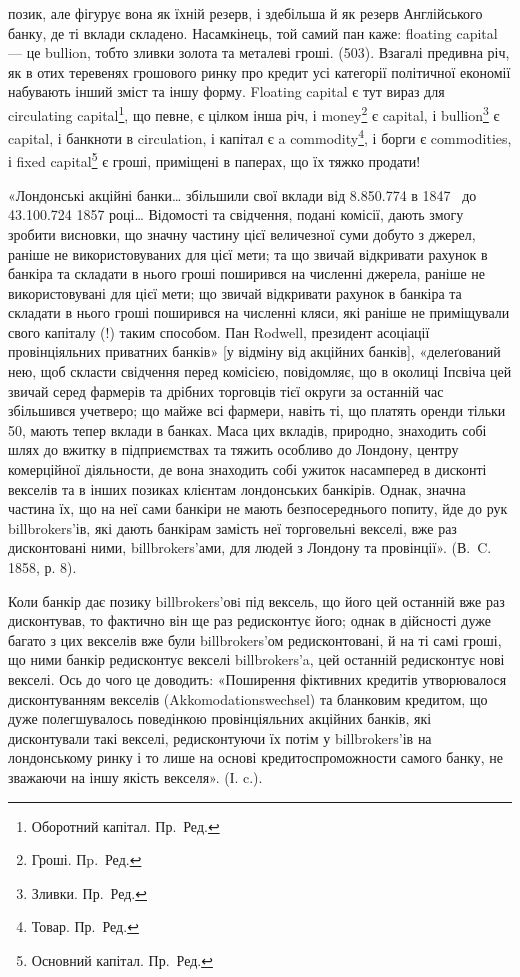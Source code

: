 \parcont{}  %
позик, але фігурує вона як їхній резерв, і здебільша й як резерв Англійського
банку, де ті вклади складено. Насамкінець, той самий пан каже: floating
capital — це bullion, тобто зливки золота та металеві гроші. (503). Взагалі предивна
річ, як в отих теревенях грошового ринку про кредит усі категорії політичної
економії набувають інший зміст та іншу форму. Floating capital є тут
вираз для circulating capital\footnote*{
Оборотний капітал. Пр.~Ред.
}, що певне, є цілком інша річ, і money\footnote*{
Гроші. Пp.~Ред.
} є capital,
і bullion\footnote*{
Зливки. Пр.~Ред.
} є capital, і банкноти в circulation, і капітал є a commodity\footnote*{
Товар. Пр.~Ред.
}, і борги є
commodities, і fixed capital\footnote*{
Основний капітал. Пр.~Ред.
} є гроші, приміщені в паперах, що їх тяжко продати!

«Лондонські акційні банки\dots{} збільшили свої вклади від \num{8.850.774}
в 1847~ до \num{43.100.724} 1857 році\dots{} Відомості та свідчення, подані
комісії, дають змогу зробити висновки, що значну частину цієї величезної суми
добуто з джерел, раніше не використовуваних для цієї мети; та що звичай відкривати
рахунок в банкіра та складати в нього гроші поширився на численні
джерела, раніше не використовувані для цієї мети; що звичай відкривати рахунок
в банкіра та складати в нього гроші поширився на численні кляси, які
раніше не приміщували свого капіталу (!) таким способом. Пан Rodwell, президент
асоціації провінціяльних приватних банків» [у відміну від акційних
банків], «делеґований нею, щоб скласти свідчення перед комісією, повідомляє,
що в околиці Іпсвіча цей звичай серед фармерів та дрібних торговців тієї
округи за останній час збільшився учетверо; що майже всі фармери, навіть ті,
що платять оренди тільки 50, мають тепер вклади в банках. Маса
цих вкладів, природно, знаходить собі шлях до вжитку в підприємствах та
тяжить особливо до Лондону, центру комерційної діяльности, де вона знаходить
собі ужиток насамперед в дисконті векселів та в інших позиках клієнтам лондонських
банкірів. Однак, значна частина їх, що на неї сами банкіри не мають
безпосереднього попиту, йде до рук billbrokers’ів, які дають банкірам замість
неї торговельні векселі, вже раз дисконтовані ними, billbrokers’ами, для людей
з Лондону та провінції». (В.~C. 1858, р. 8).

Коли банкір дає позику billbrokers’овi під вексель, що його цей останній
вже раз дисконтував, то фактично він ще раз редисконтує його; однак в дійсності
дуже багато з цих векселів вже були billbrokers’ом редисконтовані, й на
ті самі гроші, що ними банкір редисконтує векселі billbrokers’a, цей останній
редисконтує нові векселі. Ось до чого це доводить: «Поширення фіктивних кредитів
утворювалося дисконтуванням векселів (Akkomodationswechsel) та бланковим
кредитом, що дуже полегшувалось поведінкою провінціяльних акційних банків,
які дисконтували такі векселі, редисконтуючи їх потім у billbrokers’ів на лондонському
ринку і то лише на основі кредитоспроможности самого банку, не
зважаючи на іншу якість векселя». (І. c.).

